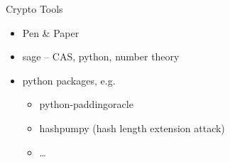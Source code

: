 {
\begin{frame}

%
%
\end{frame}
}

\begin{frame}
  {Crypto Tools}

  \begin{itemize}
    \item Pen \& Paper
    \item sage -- CAS, python, number theory
    \item python packages, e.g.
      \begin{itemize}
        \item python-paddingoracle
        \item hashpumpy (hash length extension attack)
        \item \ldots
      \end{itemize}
  \end{itemize}
\end{frame}


%


